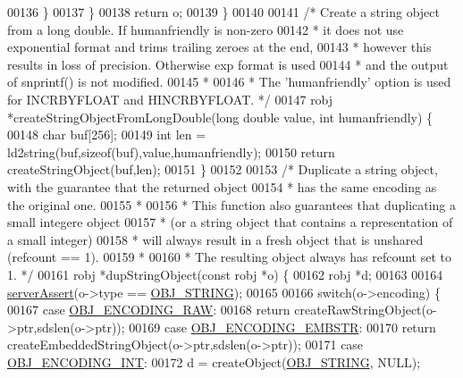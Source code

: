 \begin{DoxyCode}
00136         \}
00137     \}
00138     \textcolor{keywordflow}{return} o;
00139 \}
00140 
00141 \textcolor{comment}{/* Create a string object from a long double. If humanfriendly is non-zero}
00142 \textcolor{comment}{ * it does not use exponential format and trims trailing zeroes at the end,}
00143 \textcolor{comment}{ * however this results in loss of precision. Otherwise exp format is used}
00144 \textcolor{comment}{ * and the output of snprintf() is not modified.}
00145 \textcolor{comment}{ *}
00146 \textcolor{comment}{ * The 'humanfriendly' option is used for INCRBYFLOAT and HINCRBYFLOAT. */}
00147 robj *createStringObjectFromLongDouble(\textcolor{keywordtype}{long} \textcolor{keywordtype}{double} value, \textcolor{keywordtype}{int} humanfriendly) \{
00148     \textcolor{keywordtype}{char} buf[256];
00149     \textcolor{keywordtype}{int} len = ld2string(buf,\textcolor{keyword}{sizeof}(buf),value,humanfriendly);
00150     \textcolor{keywordflow}{return} createStringObject(buf,len);
00151 \}
00152 
00153 \textcolor{comment}{/* Duplicate a string object, with the guarantee that the returned object}
00154 \textcolor{comment}{ * has the same encoding as the original one.}
00155 \textcolor{comment}{ *}
00156 \textcolor{comment}{ * This function also guarantees that duplicating a small integere object}
00157 \textcolor{comment}{ * (or a string object that contains a representation of a small integer)}
00158 \textcolor{comment}{ * will always result in a fresh object that is unshared (refcount == 1).}
00159 \textcolor{comment}{ *}
00160 \textcolor{comment}{ * The resulting object always has refcount set to 1. */}
00161 robj *dupStringObject(\textcolor{keyword}{const} robj *o) \{
00162     robj *d;
00163 
00164     \hyperlink{server_8h_a88114b5169b4c382df6b56506285e56a}{serverAssert}(o->type == \hyperlink{server_8h_a65236ea160f69cdef33ec942092af88f}{OBJ\_STRING});
00165 
00166     \textcolor{keywordflow}{switch}(o->encoding) \{
00167     \textcolor{keywordflow}{case} \hyperlink{server_8h_a148bc85e3074e324a6dc5eebcad1bcd5}{OBJ\_ENCODING\_RAW}:
00168         \textcolor{keywordflow}{return} createRawStringObject(o->ptr,sdslen(o->ptr));
00169     \textcolor{keywordflow}{case} \hyperlink{server_8h_ac5bb76b546161fd0da4b0ff89b3142ee}{OBJ\_ENCODING\_EMBSTR}:
00170         \textcolor{keywordflow}{return} createEmbeddedStringObject(o->ptr,sdslen(o->ptr));
00171     \textcolor{keywordflow}{case} \hyperlink{server_8h_ae934cf008a0be0ef009c92c2d006a816}{OBJ\_ENCODING\_INT}:
00172         d = createObject(\hyperlink{server_8h_a65236ea160f69cdef33ec942092af88f}{OBJ\_STRING}, NULL);

\end{DoxyCode}
